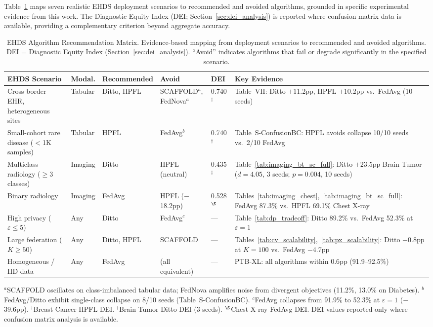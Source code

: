 \documentclass[conference]{IEEEtran}
\begin{document}
Table~\ref{tab:algo_recommendation} maps seven realistic EHDS deployment scenarios to recommended and avoided algorithms, grounded in specific experimental evidence from this work. The Diagnostic Equity Index (DEI; Section~\ref{sec:dei_analysis}) is reported where confusion matrix data is available, providing a complementary criterion beyond aggregate accuracy.

\begin{table}[htbp]
\centering
\caption{EHDS Algorithm Recommendation Matrix. Evidence-based mapping from deployment scenarios to recommended and avoided algorithms. DEI = Diagnostic Equity Index (Section~\ref{sec:dei_analysis}). ``Avoid'' indicates algorithms that fail or degrade significantly in the specified scenario.}
\label{tab:algo_recommendation}
\small
\begin{tabular}{p{3.2cm}p{1.2cm}p{2.0cm}p{2.5cm}p{0.8cm}p{4.8cm}}
\toprule
\textbf{EHDS Scenario} & \textbf{Modal.} & \textbf{Recommended} & \textbf{Avoid} & \textbf{DEI} & \textbf{Key Evidence} \\
\midrule
Cross-border EHR, heterogeneous sites & Tabular & Ditto, HPFL & SCAFFOLD$^a$, FedNova$^a$ & 0.740$^\dagger$ & Table~VII: Ditto $+$11.2pp, HPFL $+$10.2pp vs.\ FedAvg (10 seeds) \\
\addlinespace
Small-cohort rare disease ($<$1K samples) & Tabular & HPFL & FedAvg$^b$ & 0.740$^\dagger$ & Table~S-ConfusionBC: HPFL avoids collapse 10/10 seeds vs.\ 2/10 FedAvg \\
\addlinespace
Multiclass radiology ($\geq$3 classes) & Imaging & Ditto & HPFL (neutral) & 0.435$^\ddagger$ & Table~\ref{tab:imaging_bt_sc_full}: Ditto $+$23.5pp Brain Tumor ($d{=}4.05$, 3 seeds; $p{=}0.004$, 10 seeds) \\
\addlinespace
Binary radiology & Imaging & FedAvg & HPFL ($-$18.2pp) & 0.528$^\S$ & Tables~\ref{tab:imaging_chest},~\ref{tab:imaging_bt_sc_full}: FedAvg 87.3\% vs.\ HPFL 69.1\% Chest X-ray \\
\addlinespace
High privacy ($\varepsilon \leq 5$) & Any & Ditto & FedAvg$^c$ & --- & Table~\ref{tab:dp_tradeoff}: Ditto 89.2\% vs.\ FedAvg 52.3\% at $\varepsilon{=}1$ \\
\addlinespace
Large federation ($K \geq 50$) & Any & Ditto, HPFL & SCAFFOLD & --- & Tables~\ref{tab:cv_scalability},~\ref{tab:px_scalability}: Ditto $-$0.8pp at $K{=}100$ vs.\ FedAvg $-$4.7pp \\
\addlinespace
Homogeneous / IID data & Any & FedAvg & (all equivalent) & --- & PTB-XL: all algorithms within 0.6pp (91.9--92.5\%) \\
\bottomrule
\end{tabular}

\vspace{1mm}
\footnotesize{$^a$SCAFFOLD oscillates on class-imbalanced tabular data; FedNova amplifies noise from divergent objectives (11.2\%, 13.0\% on Diabetes). $^b$FedAvg/Ditto exhibit single-class collapse on 8/10 seeds (Table~S-ConfusionBC). $^c$FedAvg collapses from 91.9\% to 52.3\% at $\varepsilon{=}1$ ($-$39.6pp). $^\dagger$Breast Cancer HPFL DEI. $^\ddagger$Brain Tumor Ditto DEI (3 seeds). $^\S$Chest X-ray FedAvg DEI. DEI values reported only where confusion matrix analysis is available.}
\end{table}
\end{document}
